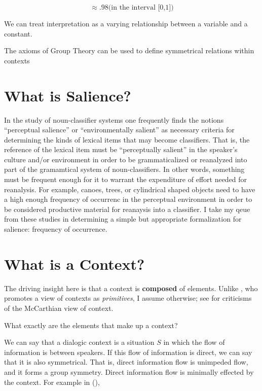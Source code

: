 \documentclass{article}
\begin{document}
\begin{equation}
 [\mathbb{C}_{A,c}(p) \geq c_{\tau}] \approx .98 \text{(in the interval [0,1])}
\end{equation}

\begin{premise}\label{var} 
We can treat interpretation as a varying relationship between a variable and a constant.
\end{premise}

\begin{premise}\label{group}
The axioms of Group Theory can be used to define symmetrical relations within contexts 
\end{premise}

\section{What is Salience?}
In the study of noun-classifier systems one frequently finds the notions ``perceptual salience'' or ``environmentally salient'' as necessary criteria for determining the kinds of lexical items that may become classifiers. That is, the reference of the lexical item must be ``perceptually salient'' in the speaker's culture and/or environment in order to be grammaticalized or reanalyzed into part of the gramamtical system of noun-classifiers. In other words, something must be frequent enough for it to warrant the expenditure of effort needed for reanalysis. For example, canoes, trees, or cylindrical shaped objects need to have a high enough frequency of occurrenc in the perceptual environment in order to be considered productive material for reanaysis into a classifier. I take my qeue from these studies in determining a simple but appropriate formalization for salience: frequency of occurrence.

\section{What is a Context?}
The driving insight here is that a context is {\bf composed} of elements. Unlike \cite{mccarthy96logicaicontext}, who promotes a view of contexts as {\sl primitives}, I assume otherwise; see \cite{hirst00spuriouscontext} for criticisms of the McCarthian view of context. 

What exactly are the elements that make up a context?

We can say that a dialogic context is a situation $S$ in which the flow of information is between speakers. If this flow of information is direct, we can say that it is also symmetrical. That is, direct information flow is unimpeded flow, and it forms a group symmetry. Direct information flow is minimally effected by the context. For example in (\nextx),
\end{document}
